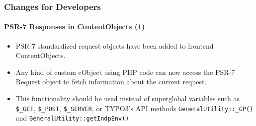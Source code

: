 %

\begin{frame}[fragile]
	\frametitle{Changes for Developers}
	\framesubtitle{PSR-7 Responses in ContentObjects (1)}

	\begin{itemize}
		\item PSR-7 standardized request objects have been added to frontend ContentObjects.
		\item Any kind of custom cObject using PHP code can now access the PSR-7
			Request object to fetch information about the current request.
		\item This functionality should be used instead of superglobal variables
			such as\newline
			\texttt{\$\_GET}, \texttt{\$\_POST}, \texttt{\$\_SERVER},
			or TYPO3's API methods \texttt{GeneralUtility::_GP()} and
			\texttt{GeneralUtility::getIndpEnv()}.

	\end{itemize}
\end{frame}


